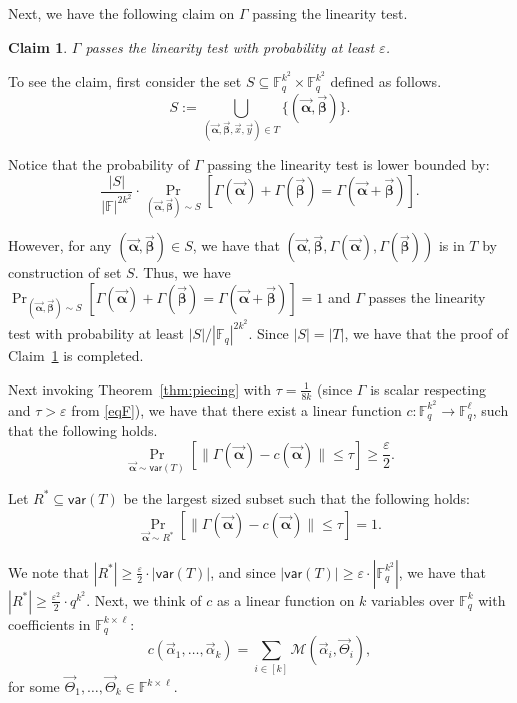 \documentclass[11pt]{article}
\newcommand{\F}{\mathbb{F}}
\renewcommand{\ge}{ \geqslant}
\renewcommand{\le}{ \leqslant}
\newtheorem{claim}[theorem]{Claim}
\newcommand{\alphab}{\vec{\bm{\alpha}}}
\newcommand{\betab}{\vec{\bm{\beta}}}
\newcommand{\var}{\mathsf{var}}
\renewcommand{\kappa}{\tau}
\newcommand{\M}{\mathcal{M}}
\begin{document}
Next, we have the following claim on $\Gamma$ passing the linearity test.

\begin{claim}\label{claim:lintest}
$\Gamma$ passes the linearity test with probability at least $\varepsilon$. 
\end{claim}

To see the claim, first consider the set $S\subseteq \F_q^{k^2}\times \F_q^{k^2}$ defined as follows.
$$
S:=\underset{(\alphab,\betab,\vec{x},\vec{y})\in T}{\bigcup}\{(\alphab,\betab)\}.
$$  

Notice that the probability of $\Gamma$ passing the linearity test is lower bounded by:
$$
\frac{|S|}{|\F|^{2k^2}}\cdot \Pr_{(\vec{\bm{\alpha}},\vec{\bm{\beta}})\sim S}\left[\Gamma(\vec{\bm{\alpha}})+\Gamma(\vec{\bm{\beta}})=\Gamma(\vec{\bm{\alpha}}+\vec{\bm{\beta}})\right].
$$
 
However, for any $(\alphab,\betab)\in S$, we have that $(\alphab,\betab,\Gamma(\alphab),\Gamma(\betab))$ is in $T$ by construction of set $S$.  Thus, we have $\Pr_{(\vec{\bm{\alpha}},\vec{\bm{\beta}})\sim S}\left[\Gamma(\vec{\bm{\alpha}})+\Gamma(\vec{\bm{\beta}})=\Gamma(\vec{\bm{\alpha}}+\vec{\bm{\beta}})\right]=1$ and $\Gamma$ passes the linearity test with probability at least $|S|/|\F_q|^{2k^2}$. Since $|S|=|T|$, we have that the proof of Claim~\ref{claim:lintest} is completed. 
	



Next invoking Theorem~\ref{thm:piecing} with $\kappa=\frac{1}{8k}$ (since $\Gamma$ is scalar respecting and $\kappa> \varepsilon$ from \eqref{eqF}), we have that there exist a linear function $c:\F_q^{k^2}\to\F_q^{\ell}$, such that the following holds.
$$
\underset{\vec{\bm{\alpha}}\sim \var(T) }{\Pr}\left[\|\Gamma(\vec{\bm{\alpha}})-c(\vec{\bm{\alpha}})\|\le \kappa  \right]\ge \frac{\varepsilon}{2}.
$$ 

Let $R^\ast\subseteq \var(T)$ be the largest sized subset such that the following holds:
\begin{align}
\underset{\vec{\bm{\alpha}}\sim R^\ast }{\Pr}\left[\|\Gamma(\vec{\bm{\alpha}})-c(\vec{\bm{\alpha}})\|\le \kappa  \right]=1
.\label{eq:lin1}
\end{align}

We note that $|R^\ast|\ge \frac{\varepsilon}{2}\cdot |\var(T)|$, and since $|\var(T)|\ge \varepsilon\cdot |\F_q^{k^2}|$, we have that $|R^\ast|\ge \frac{\varepsilon^2}{2}\cdot q^{k^2}$.  
Next, we think of $c$ as a linear function on $k$ variables over $\F_q^k$ with coefficients  in $\F_q^{k\times \ell}$:
$$c(\vec{\alpha}_1,\ldots ,\vec{\alpha}_k)=\sum_{i\in[k]}\M(\vec{\alpha}_i,\vec{\Theta}_i ),$$ 
for some $\vec{\Theta}_1 ,\ldots ,\vec{\Theta}_k \in\mathbb{F}^{k\times \ell}$.
\end{document}

